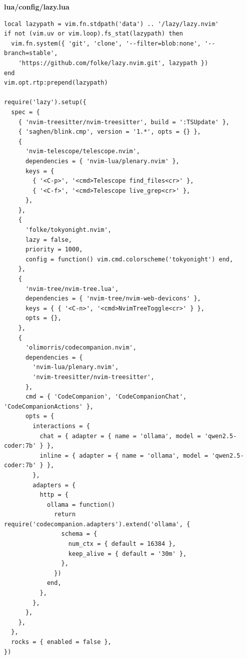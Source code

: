 \textbf{lua/config/lazy.lua}
\begin{lstlisting}
local lazypath = vim.fn.stdpath('data') .. '/lazy/lazy.nvim'
if not (vim.uv or vim.loop).fs_stat(lazypath) then
  vim.fn.system({ 'git', 'clone', '--filter=blob:none', '--branch=stable',
    'https://github.com/folke/lazy.nvim.git', lazypath })
end
vim.opt.rtp:prepend(lazypath)

require('lazy').setup({
  spec = {
    { 'nvim-treesitter/nvim-treesitter', build = ':TSUpdate' },
    { 'saghen/blink.cmp', version = '1.*', opts = {} },
    {
      'nvim-telescope/telescope.nvim',
      dependencies = { 'nvim-lua/plenary.nvim' },
      keys = {
        { '<C-p>', '<cmd>Telescope find_files<cr>' },
        { '<C-f>', '<cmd>Telescope live_grep<cr>' },
      },
    },
    {
      'folke/tokyonight.nvim',
      lazy = false,
      priority = 1000,
      config = function() vim.cmd.colorscheme('tokyonight') end,
    },
    {
      'nvim-tree/nvim-tree.lua',
      dependencies = { 'nvim-tree/nvim-web-devicons' },
      keys = { { '<C-n>', '<cmd>NvimTreeToggle<cr>' } },
      opts = {},
    },
    {
      'olimorris/codecompanion.nvim',
      dependencies = {
        'nvim-lua/plenary.nvim',
        'nvim-treesitter/nvim-treesitter',
      },
      cmd = { 'CodeCompanion', 'CodeCompanionChat', 'CodeCompanionActions' },
      opts = {
        interactions = {
          chat = { adapter = { name = 'ollama', model = 'qwen2.5-coder:7b' } },
          inline = { adapter = { name = 'ollama', model = 'qwen2.5-coder:7b' } },
        },
        adapters = {
          http = {
            ollama = function()
              return require('codecompanion.adapters').extend('ollama', {
                schema = {
                  num_ctx = { default = 16384 },
                  keep_alive = { default = '30m' },
                },
              })
            end,
          },
        },
      },
    },
  },
  rocks = { enabled = false },
})
\end{lstlisting}

